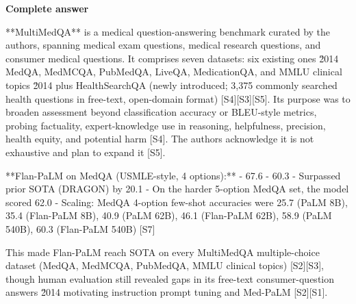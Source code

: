 \documentclass[10pt]{article}
\begin{document}
\textbf{Complete answer}
\begin{AnswerText}
**MultiMedQA** is a medical question-answering benchmark curated by the authors, spanning medical exam questions, medical research questions, and consumer medical questions. It comprises seven datasets: six existing ones \u2014 MedQA, MedMCQA, PubMedQA, LiveQA, MedicationQA, and MMLU clinical topics \u2014 plus HealthSearchQA (newly introduced; 3,375 commonly searched health questions in free-text, open-domain format) [S4][S3][S5]. Its purpose was to broaden assessment beyond classification accuracy or BLEU-style metrics, probing factuality, expert-knowledge use in reasoning, helpfulness, precision, health equity, and potential harm [S4]. The authors acknowledge it is not exhaustive and plan to expand it [S5].

**Flan-PaLM on MedQA (USMLE-style, 4 options):**
- 67.6%
- 60.3%
- Surpassed prior SOTA (DRAGON) by 20.1%
- On the harder 5-option MedQA set, the model scored 62.0%
- Scaling: MedQA 4-option few-shot accuracies were 25.7 (PaLM 8B), 35.4 (Flan-PaLM 8B), 40.9 (PaLM 62B), 46.1 (Flan-PaLM 62B), 58.9 (PaLM 540B), 60.3 (Flan-PaLM 540B) [S7]

This made Flan-PaLM reach SOTA on every MultiMedQA multiple-choice dataset (MedQA, MedMCQA, PubMedQA, MMLU clinical topics) [S2][S3], though human evaluation still revealed gaps in its free-text consumer-question answers \u2014 motivating instruction prompt tuning and Med-PaLM [S2][S1].
\end{AnswerText}
\end{document}
